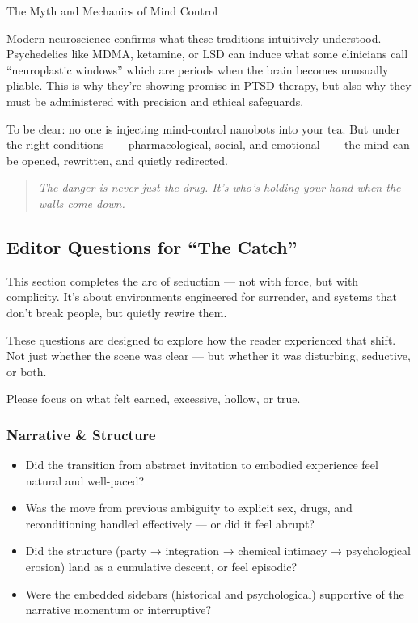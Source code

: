 \begin{PsychologicalSidebar}{The Myth and Mechanics of Mind Control}
  \medskip
  
  Modern neuroscience confirms what these traditions intuitively understood. Psychedelics like MDMA, ketamine, or LSD 
  can induce what some clinicians call “neuroplastic windows” which are periods when the brain becomes unusually 
  pliable. This is why they’re showing promise in PTSD therapy, but also why they must be administered with 
  precision and ethical safeguards. 

  \medskip
  
  To be clear: no one is injecting mind-control nanobots into your tea. But under the right conditions 
  —-- pharmacological, social, and emotional —-- the mind can be opened, rewritten, and quietly 
  redirected.
  
  \begin{quote}
  \textit{The danger is never just the drug. It’s who’s holding your hand when the walls come down.}
  \end{quote}
  
\end{PsychologicalSidebar}

\medskip

\subsection*{Editor Questions for ``The Catch''}

This section completes the arc of seduction — not with force, but with complicity.
It’s about environments engineered for surrender, and systems that don’t break people, but quietly rewire them.

These questions are designed to explore how the reader experienced that shift.
Not just whether the scene was clear — but whether it was disturbing, seductive, or both.

Please focus on what felt earned, excessive, hollow, or true.

\subsubsection{Narrative \& Structure}

\begin{itemize}
\item Did the transition from abstract invitation to embodied experience feel natural and well-paced?
\item Was the move from previous ambiguity to explicit sex, drugs, and reconditioning handled effectively — or did it feel abrupt?
\item Did the structure (party → integration → chemical intimacy → psychological erosion) land as a cumulative descent, or feel episodic?
\item Were the embedded sidebars (historical and psychological) supportive of the narrative momentum or interruptive?
\end{itemize}

